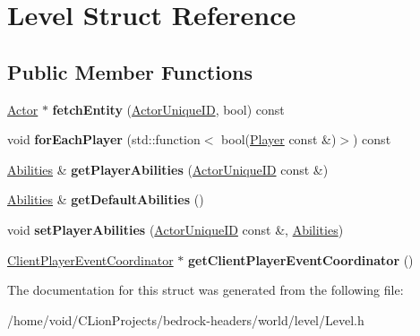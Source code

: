 \hypertarget{struct_level}{}\section{Level Struct Reference}
\label{struct_level}
\subsection*{Public Member Functions}
\begin{DoxyCompactItemize}
\item 
\mbox{\label{struct_level_a7106f429ef9fc25804dd5ad309115697}} 
\mbox{\hyperlink{struct_actor}{Actor}} $\ast$ {\bfseries fetch\+Entity} (\mbox{\hyperlink{struct_actor_unique_i_d}{Actor\+Unique\+ID}}, bool) const
\item 
\mbox{\label{struct_level_aabc96b0caf234abfb98ffc18d95b98f4}} 
void {\bfseries for\+Each\+Player} (std\+::function$<$ bool(\mbox{\hyperlink{struct_player}{Player}} const \&)$>$) const
\item 
\mbox{\label{struct_level_ace9f1b14141a31ddafa8c927343e324f}} 
\mbox{\hyperlink{struct_abilities}{Abilities}} \& {\bfseries get\+Player\+Abilities} (\mbox{\hyperlink{struct_actor_unique_i_d}{Actor\+Unique\+ID}} const \&)
\item 
\mbox{\label{struct_level_a8da412fca73cfef02d54663ba066d6e9}} 
\mbox{\hyperlink{struct_abilities}{Abilities}} \& {\bfseries get\+Default\+Abilities} ()
\item 
\mbox{\label{struct_level_a27fe6cce1fa54391e75afdc1c34c04b1}} 
void {\bfseries set\+Player\+Abilities} (\mbox{\hyperlink{struct_actor_unique_i_d}{Actor\+Unique\+ID}} const \&, \mbox{\hyperlink{struct_abilities}{Abilities}})
\item 
\mbox{\label{struct_level_a35dcb598b7f23f3edb3940df5d6629c3}} 
\mbox{\hyperlink{struct_client_player_event_coordinator}{Client\+Player\+Event\+Coordinator}} $\ast$ {\bfseries get\+Client\+Player\+Event\+Coordinator} ()
\end{DoxyCompactItemize}


The documentation for this struct was generated from the following file\+:\begin{DoxyCompactItemize}
\item 
/home/void/\+C\+Lion\+Projects/bedrock-\/headers/world/level/Level.\+h\end{DoxyCompactItemize}

